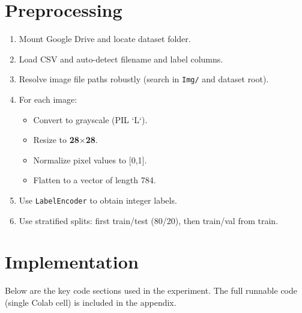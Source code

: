 \documentclass[11pt,a4paper]{article}
\begin{document}
\section{Preprocessing}
\begin{enumerate}
  \item Mount Google Drive and locate dataset folder.
  \item Load CSV and auto-detect filename and label columns.
  \item Resolve image file paths robustly (search in \texttt{Img/} and dataset root).
  \item For each image:
    \begin{itemize}
      \item Convert to grayscale (PIL `L`).
      \item Resize to \textbf{28$\times$28}.
      \item Normalize pixel values to [0,1].
      \item Flatten to a vector of length 784.
    \end{itemize}
  \item Use \texttt{LabelEncoder} to obtain integer labels.
  \item Use stratified splits: first train/test (80/20), then train/val from train.
\end{enumerate}

\section{Implementation}
Below are the key code sections used in the experiment. The full runnable code (single Colab cell) is included in the appendix.
\end{document}
